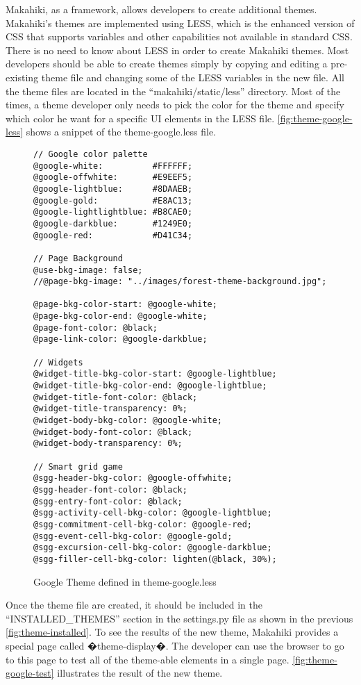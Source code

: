 Makahiki, as a framework, allows developers to create additional themes. Makahiki's themes are implemented using LESS, which is the  enhanced version of CSS that supports variables and other capabilities not available in standard CSS. There is no need to know about LESS in order to create Makahiki themes. Most developers should be able to create themes simply by copying and editing a pre-existing theme file and changing some of the LESS variables in the new file. All the theme files are located in the ``makahiki/static/less'' directory.  Most of the times, a theme developer only needs to pick the color for the theme and specify which color he want for a specific UI elements in the LESS file. \autoref{fig:theme-google-less} shows a snippet of the theme-google.less file.

\begin{figure}[!ht]
\begin{lstlisting}
// Google color palette
@google-white:          #FFFFFF;
@google-offwhite:       #E9EEF5;
@google-lightblue:      #8DAAEB;
@google-gold:           #E8AC13;
@google-lightlightblue: #B8CAE0;
@google-darkblue:       #1249E0;
@google-red:            #D41C34;

// Page Background
@use-bkg-image: false;
//@page-bkg-image: "../images/forest-theme-background.jpg";

@page-bkg-color-start: @google-white;
@page-bkg-color-end: @google-white;
@page-font-color: @black;
@page-link-color: @google-darkblue;

// Widgets
@widget-title-bkg-color-start: @google-lightblue;
@widget-title-bkg-color-end: @google-lightblue;
@widget-title-font-color: @black;
@widget-title-transparency: 0%;
@widget-body-bkg-color: @google-white;
@widget-body-font-color: @black;
@widget-body-transparency: 0%;

// Smart grid game
@sgg-header-bkg-color: @google-offwhite;
@sgg-header-font-color: @black;
@sgg-entry-font-color: @black;
@sgg-activity-cell-bkg-color: @google-lightblue;
@sgg-commitment-cell-bkg-color: @google-red;
@sgg-event-cell-bkg-color: @google-gold;
@sgg-excursion-cell-bkg-color: @google-darkblue;
@sgg-filler-cell-bkg-color: lighten(@black, 30%);

\end{lstlisting}
\caption{Google Theme defined in theme-google.less}
\label{fig:theme-google-less}
\end{figure}

Once the theme file are created, it should be included in the ``INSTALLED\_THEMES'' section in the settings.py file as shown in the previous \autoref{fig:theme-installed}. To see the results of the new theme, Makahiki provides a special page called �theme-display�. The developer can use the browser to go to this page to test all of the theme-able elements in a single page. \autoref{fig:theme-google-test} illustrates the result of the new theme.

